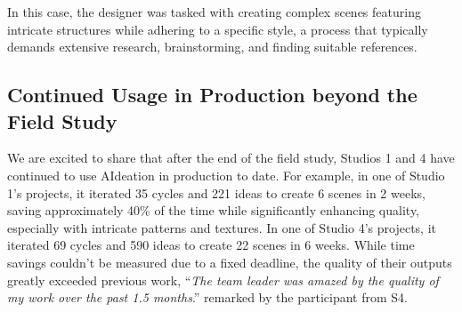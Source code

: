 In this case, the designer was tasked with creating complex scenes featuring intricate structures while adhering to a specific style, a process that typically demands extensive research, brainstorming, and finding suitable references. %




\subsection{Continued Usage in Production beyond the Field Study}
We are excited to share that after the end of the field study, Studios 1 and 4 have continued to use AIdeation in production to date. For example, in one of Studio 1's projects, it iterated 35 cycles and 221 ideas to create 6 scenes in 2 weeks, saving approximately 40\% of the time while significantly enhancing quality, especially with intricate patterns and textures. In one of Studio 4's projects, it iterated 69 cycles and 590 ideas to create 22 scenes in 6 weeks. While time savings couldn't be measured due to a fixed deadline, the quality of their outputs greatly exceeded previous work, “\textit{The team leader was amazed by the quality of my work over the past 1.5 months}.” remarked by the participant from S4.




